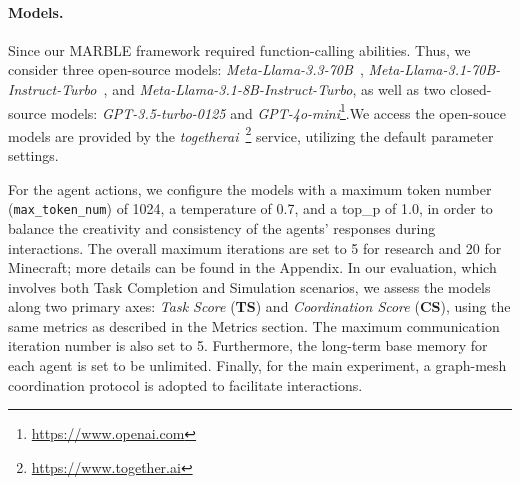 \paragraph{Models.} Since our MARBLE framework required function-calling abilities. Thus, we consider three open-source models: \textit{Meta-Llama-3.3-70B~\citep{dubey2024llama}}, \textit{Meta-Llama-3.1-70B-Instruct-Turbo~\citep{dubey2024llama}}, and \textit{Meta-Llama-3.1-8B-Instruct-Turbo}, as well as two closed-source models: \textit{GPT-3.5-turbo-0125} and \textit{GPT-4o-mini}\footnote{\href{https://www.openai.com}{https://www.openai.com}}.We access the open-souce models are provided by the \textit{togetherai}~\footnote{\href{https://www.together.ai}{https://www.together.ai}} service, utilizing the default parameter settings. 

For the agent actions, we configure the models with a maximum token number (\texttt{max\_token\_num}) of 1024, a temperature of 0.7, and a top\_p of 1.0, in order to balance the creativity and consistency of the agents' responses during interactions. The overall maximum iterations are set to 5 for research and 20 for Minecraft; more details can be found in the Appendix.  In our evaluation, which involves both Task Completion and Simulation scenarios, we assess the models along two primary axes: \emph{Task Score} (\textbf{TS}) and \emph{Coordination Score} (\textbf{CS}), using the same metrics as described in the Metrics section. The maximum communication iteration number is also set to 5. Furthermore, the long-term base memory for each agent is set to be unlimited. Finally, for the main experiment, a graph-mesh coordination protocol is adopted to facilitate interactions.






